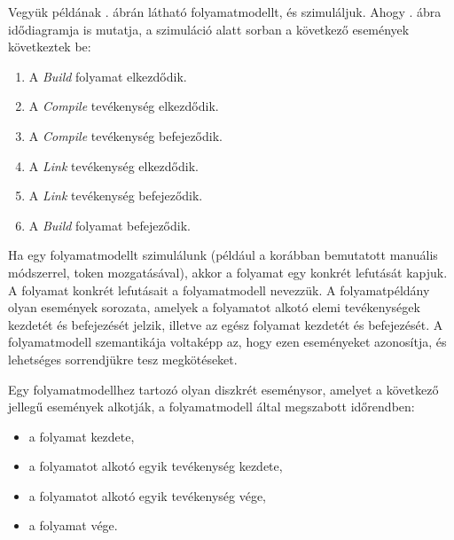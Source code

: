 \begin{pelda}
Vegyük példának . ábrán látható folyamatmodellt, és szimuláljuk. Ahogy . ábra idődiagramja is mutatja, a szimuláció alatt sorban a következő események következtek be: \begin{enumerate}
  \item A \emph{Build} folyamat elkezdődik.
  \item A \emph{Compile} tevékenység elkezdődik.
  \item A \emph{Compile} tevékenység befejeződik.
  \item A \emph{Link} tevékenység elkezdődik.
  \item A \emph{Link} tevékenység befejeződik.
  \item A \emph{Build} folyamat befejeződik.
\end{enumerate}
\end{pelda}


Ha egy folyamatmodellt szimulálunk (például a korábban bemutatott manuális módszerrel, token mozgatásával), akkor a folyamat egy konkrét lefutását kapjuk. A folyamat konkrét lefutásait a folyamatmodell  nevezzük. A folyamatpéldány olyan események sorozata, amelyek a folyamatot alkotó elemi tevékenységek kezdetét és befejezését jelzik, illetve az egész folyamat kezdetét és befejezését. A folyamatmodell szemantikája voltaképp az, hogy ezen eseményeket azonosítja, és lehetséges sorrendjükre tesz megkötéseket.

\begin{definicio}
	Egy folyamatmodellhez tartozó  olyan diszkrét eseménysor, amelyet a következő jellegű események alkotják, a folyamatmodell által megszabott időrendben: 	\begin{itemize}
	  \item a folyamat kezdete,
	  \item a folyamatot alkotó egyik tevékenység kezdete, 
	  \item a folyamatot alkotó egyik tevékenység vége, 
	  \item a folyamat vége.
	\end{itemize}
\end{definicio}

